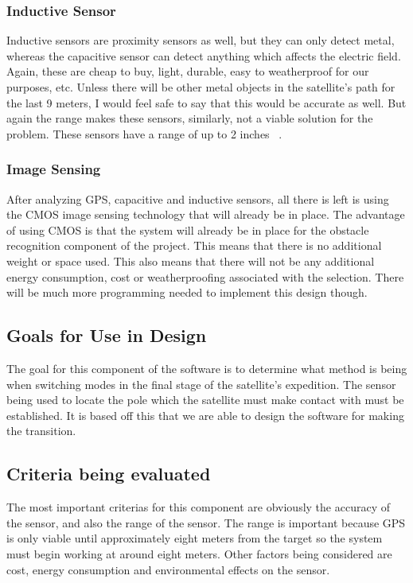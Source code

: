 \documentclass[10pt,letterpaper,onecolumn,journal]{IEEEtran}
\begin{document}
\subsubsection{Inductive Sensor}
Inductive sensors are proximity sensors as well, but they can only detect metal, whereas the capacitive sensor can detect anything which affects the electric field. Again, these are cheap to buy, light, durable, easy to weatherproof for our purposes, etc. Unless there will be other metal objects in the satellite’s path for the last 9 meters, I would feel safe to say that this would be accurate as well. But again the range makes these sensors, similarly, not a viable solution for the problem. These sensors have a range of up to 2 inches ~\cite{inductive}. 
\subsubsection{Image Sensing}
After analyzing GPS, capacitive and inductive sensors, all there is left is using the CMOS image sensing technology that will already be in place. The advantage of using CMOS is that the system will already be in place for the obstacle recognition component of the project. This means that there is no additional weight or space used. This also means that there will not be any additional energy consumption, cost or weatherproofing associated with the selection. There will be much more programming needed to implement this design though.
\subsection{Goals for Use in Design}
The goal for this component of the software is to determine what method is being when switching modes in the final stage of the satellite's expedition. The sensor being used to locate the pole which the satellite must make contact with must be established. It is based off this that we are able to design the software for making the transition.
\subsection{Criteria being evaluated}
The most important criterias for this component are obviously the accuracy of the sensor, and also the range of the sensor. The range is important because GPS is only viable until approximately eight meters from the target so the system must begin working at around eight meters. Other factors being considered are cost, energy consumption and environmental effects on the sensor. 
\end{document}
